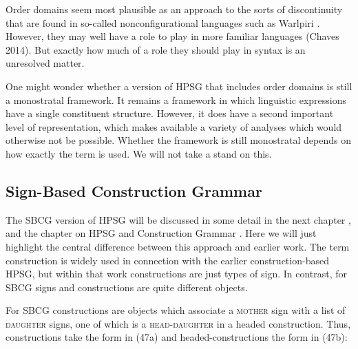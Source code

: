\documentclass[output=paper
	        ,collection
	        ,collectionchapter
 	        ,biblatex
                ,babelshorthands
                ,newtxmath
                ,draftmode
                ,colorlinks, citecolor=brown
]{langscibook}
\begin{document}
Order domains seem most plausible as an approach to the sorts of discontinuity that are found in so-called nonconfigurational languages such as Warlpiri \citep{DS99a}. However, they may well have a role to play in more familiar languages \citep{BonamiEtc1999} (Chaves 2014). But exactly how much of a role they should play in syntax is an unresolved matter.

One might wonder whether a version of HPSG that includes order domains is still a monostratal framework. It remains a framework in which linguistic expressions have a single constituent structure. However, it does have a second important level of representation, which makes available a variety of analyses which would otherwise not be possible. Whether the framework is still monostratal depends on how exactly the term is used. We will not take a stand on this.

\subsection{Sign-Based Construction Grammar}

The SBCG version of HPSG will be discussed in some detail in the next chapter , and the chapter on HPSG and Construction Grammar . Here we will just highlight the central difference between this approach and earlier work. The term construction is widely used in connection with the earlier construction-based HPSG, but within that work constructions are just types of sign. In contrast, for SBCG signs and constructions are quite different objects.

For SBCG constructions are objects which associate a \textsc{mother} sign with a list of \textsc{daughter} signs, one of which is a \textsc{head-daughter} in a headed construction. Thus, constructions take the form in (47a) and headed-constructions the form in (47b):

\begin{multicols}{2}
\ea\label{ex:prop48}
	\ea\label{ex:prop48a}
	
\columnbreak
	
	\ex\label{ex:prop48b}
\z
	\z
\end{multicols}
\end{document}
